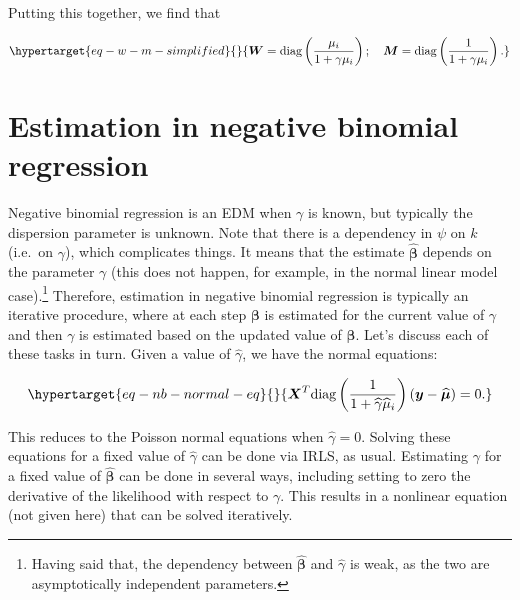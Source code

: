 \documentclass[
  11pt,
  letterpaper,
  oneside]{book}
\theoremstyle{plain}
\theoremstyle{plain}
\theoremstyle{definition}
\theoremstyle{definition}
\theoremstyle{plain}
\theoremstyle{remark}
\begin{document}
Putting this together, we find that

\begin{equation}\protect\hypertarget{eq-w-m-simplified}{}{
\boldsymbol{W} = \text{diag}\left(\frac{\mu_i}{1 + \gamma \mu_i}\right); \quad \boldsymbol{M} = \text{diag}\left(\frac{1}{1 + \gamma \mu_i}\right).
}\label{eq-w-m-simplified}\end{equation}

\hypertarget{estimation-in-negative-binomial-regression}{%
\section{Estimation in negative binomial
regression}\label{estimation-in-negative-binomial-regression}}

Negative binomial regression is an EDM when \(\gamma\) is known, but
typically the dispersion parameter is unknown. Note that there is a
dependency in \(\psi\) on \(k\) (i.e.~on \(\gamma\)), which complicates
things. It means that the estimate \(\boldsymbol{\widehat{\beta}}\)
depends on the parameter \(\gamma\) (this does not happen, for example,
in the normal linear model case).\footnote{Having said that, the
  dependency between \(\boldsymbol{\widehat{\beta}}\) and
  \(\widehat{\gamma}\) is weak, as the two are asymptotically
  independent parameters.} Therefore, estimation in negative binomial
regression is typically an iterative procedure, where at each step
\(\boldsymbol{\beta}\) is estimated for the current value of \(\gamma\)
and then \(\gamma\) is estimated based on the updated value of
\(\boldsymbol{\beta}\). Let's discuss each of these tasks in turn. Given
a value of \(\widehat{\gamma}\), we have the normal equations:

\begin{equation}\protect\hypertarget{eq-nb-normal-eq}{}{
\boldsymbol{X}^T \text{diag}\left(\frac{1}{1 + \widehat{\gamma} \widehat{\mu}_i}\right)(\boldsymbol{y} - \boldsymbol{\widehat{\mu}}) = 0.
}\label{eq-nb-normal-eq}\end{equation}

This reduces to the Poisson normal equations when
\(\widehat{\gamma} = 0\). Solving these equations for a fixed value of
\(\widehat{\gamma}\) can be done via IRLS, as usual. Estimating
\(\gamma\) for a fixed value of \(\boldsymbol{\widehat{\beta}}\) can be
done in several ways, including setting to zero the derivative of the
likelihood with respect to \(\gamma\). This results in a nonlinear
equation (not given here) that can be solved iteratively.
\end{document}
